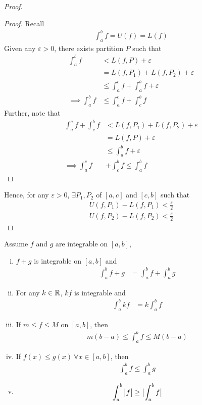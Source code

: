 \documentclass[11pt]{article}
\begin{document}
\begin{proof}
		\begin{proof}
			Recall
			\begin{align}
				\int_a^b f = U(f) = L(f)
			\end{align}
			Given any $\varepsilon > 0$, there exists partition $P$ such that
			\begin{align}
				\int_a^b f
				&< L(f, P) + \varepsilon \\
				&= L(f, P_1) + L(f, P_2) + \varepsilon \\
				&\leq \int_a^c f + \int_a^b f + \varepsilon \\
				\implies \int_a^b f &\leq \int_a^c f + \int_c^b f
			\end{align}
			Further, note that
			\begin{align}
				\int_a^c f + \int_c^b f &< L(f, P_1) + L(f, P_2) + \varepsilon \\
				&= L(f, P) + \varepsilon \\
				&\leq \int_a^b f + \varepsilon \\
				\implies \int_a^c f &+ \int_c^b f \leq \int_a^b f
			\end{align}
		\end{proof}
		Hence, for any $\varepsilon > 0$, $\exists P_1, P_2$ of $[a, c]$ and $[c, b]$ such that
		\begin{align}
			U(f, P_1) - L(f, P_1) < \frac{\varepsilon}{2} \\
			U(f, P_2) - L(f, P_2) < \frac{\varepsilon}{2}
		\end{align}
	\end{proof}
	
	\begin{theorem}
		Assume $f$ and $g$ are integrable on $[a, b]$,
		\begin{enumerate}[(i)]
			\item $f + g$ is integrable on $[a, b]$ and
				\begin{align}
					\int_a^b f + g &= \int_a^b f + \int_a^b g
				\end{align}
			\item For any $k \in \mathbb{R}$, $kf$ is integrable and 
				\begin{align}
					\int_a^b kf &= k \int_a^b f
				\end{align}
			\item If $m \leq f \leq M$ on $[a, b]$, then 
				\begin{align}
					m (b-a) \leq \int_a^b f \leq M (b-a)
				\end{align}
			\item If $f(x) \leq g(x)\ \forall x \in [a, b]$, then
				\begin{align}
					\int_a^b f \leq \int_a^b g
				\end{align}
			\item
				\begin{align}
					\int_a^b \big \vert {f} \big \vert \geq \big \vert {\int_a^b f} \big \vert
				\end{align}
		\end{enumerate}
	\end{theorem}
	
\end{document}
